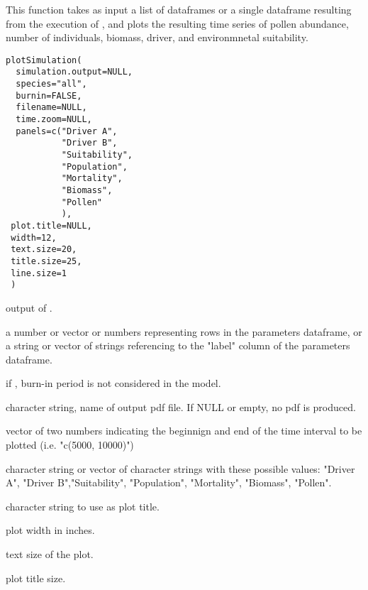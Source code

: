 \documentclass[letterpaper]{book}
\begin{document}
%
\begin{Description}\relax
This function takes as input a list of dataframes or a single dataframe resulting from the execution of , and plots the resulting time series of pollen abundance, number of individuals, biomass, driver, and environmnetal suitability.
\end{Description}
%
\begin{Usage}
\begin{verbatim}
plotSimulation(
  simulation.output=NULL,
  species="all",
  burnin=FALSE,
  filename=NULL,
  time.zoom=NULL,
  panels=c("Driver A",
           "Driver B",
           "Suitability",
           "Population",
           "Mortality",
           "Biomass",
           "Pollen"
           ),
 plot.title=NULL,
 width=12,
 text.size=20,
 title.size=25,
 line.size=1
 )
\end{verbatim}
\end{Usage}
%
\begin{Arguments}
\begin{ldescription}
\item[\code{simulation.output}] output of .

\item[\code{species}] a number or vector or numbers representing rows in the parameters dataframe, or a string or vector of strings referencing to the "label" column of the parameters dataframe.

\item[\code{burnin}] if , burn-in period is not considered in the model.

\item[\code{filename}] character string, name of output pdf file. If NULL or empty, no pdf is produced.

\item[\code{time.zoom}] vector of two numbers indicating the beginnign and end of the time interval to be plotted (i.e. "c(5000, 10000)")

\item[\code{panels}] character string or vector of character strings with these possible values: "Driver A", "Driver B","Suitability", "Population", "Mortality", "Biomass", "Pollen".

\item[\code{plot.title}] character string to use as plot title.

\item[\code{width}] plot width in inches.

\item[\code{text.size}] text size of the plot.

\item[\code{title.size}] plot title size.
\end{ldescription}
\end{Arguments}
\end{document}
